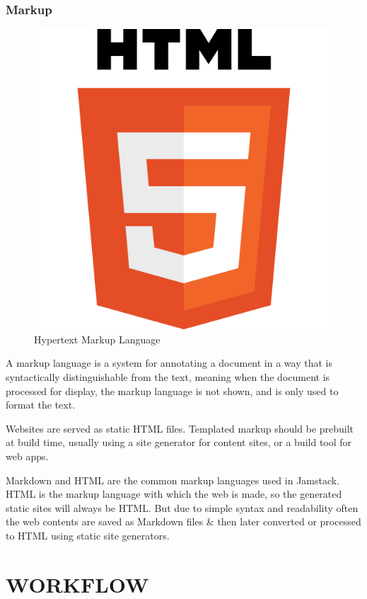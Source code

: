 \documentclass[12pt,a4paper,oneside]{report}
\begin{document}
\subsection{Markup}
\begin{figure}[H]
    \centering
    \includegraphics[scale=.2]{images/html.png}
    \caption{Hypertext Markup Language\cite{html}}
\end{figure}
\par 
A markup language is a system for annotating a document in a way that is syntactically distinguishable from the text, meaning when the document is processed for display, the markup language is not shown, and is only used to format the text.
\par 
Websites are served as static HTML files. Templated markup should be prebuilt at build time, usually using a site generator for content sites, or a build tool for web apps.
\par 
Markdown and HTML are the common markup languages used in Jamstack. HTML is the markup language with which the web is made, so the generated static sites will always be HTML. But due to simple syntax and readability often the web contents are saved as Markdown files \& then later converted or processed to HTML using static site generators.

\chapter{WORKFLOW}
\end{document}

